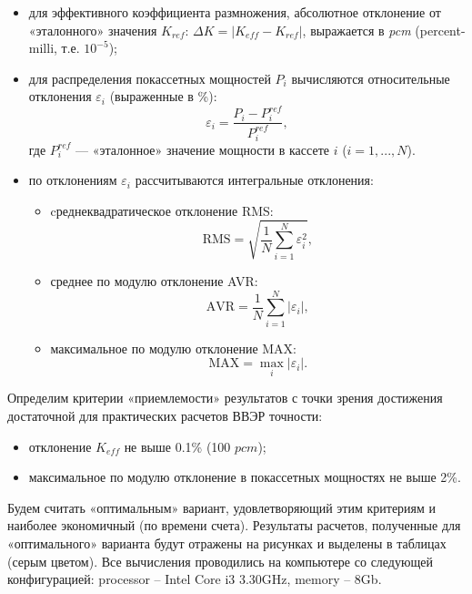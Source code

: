 \begin{itemize}\itemsep1pt \parskip0pt 
\item для эффективного коэффициента размножения, абсолютное отклонение от «эталонного» значения $K_{ref}$: $\Delta K = |K_{eff} - K_{ref}|$, выражается в \textit{pcm} (percent-milli, т.е. $10^{-5}$);
\item для распределения покассетных мощностей $P_i$ вычисляются относительные отклонения $\varepsilon_i$ (выраженные в \%):
\[
\varepsilon_i = \frac{P_i - P_i^{ref}}{P_i^{ref}},
\]
где $P_i^{ref}$ --- «эталонное» значение мощности в кассете $i$ ($i = 1,...,N$).
\item по отклонениям $\varepsilon_i$ рассчитываются интегральные отклонения:
\begin{itemize}\itemsep1pt \parskip0pt 
\item cреднеквадратическое отклонение RMS:
\[
\mathrm{RMS} = \sqrt{\frac{1}{N}\sum_{i=1}^N \varepsilon_i^2},
\]
\item среднее по модулю отклонение AVR:
\[
\mathrm{AVR} = \frac{1}{N}\sum_{i=1}^N \left\vert \varepsilon_i\right\vert,
\]
\item максимальное по модулю отклонение MAX:
\[
\mathrm{MAX} = \underset{i}{\max}\left\vert\varepsilon_i\right\vert.
\]
\end{itemize}
\end{itemize}
Определим критерии «приемлемости» результатов с точки зрения достижения достаточной для практических расчетов ВВЭР точности:
\begin{itemize}
\item отклонение $K_{eff}$ не выше 0.1\% (100 $pcm$);
\item максимальное по модулю отклонение в покассетных мощностях не выше 2\%. 
\end{itemize}
Будем считать «оптимальным» вариант, удовлетворяющий этим критериям и наиболее экономичный (по времени счета). Результаты расчетов, полученные для «оптимального» варианта будут отражены на рисунках и выделены в таблицах (серым цветом). Все вычисления проводились на компьютере со следующей конфигурацией: processor -- Intel Core i3 3.30GHz, memory -- 8Gb.
